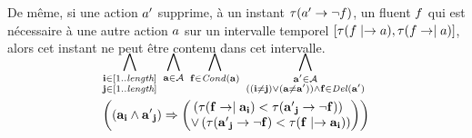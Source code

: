 De même, si une action $a'$ supprime, à un instant $\tau(a'\rightarrow\neg f)$, un fluent $f$ qui est nécessaire à une autre action $a$ sur un intervalle temporel $[\tau(f\mid\rightarrow a), \tau(f\rightarrow\mid a)]$, alors cet instant ne peut être contenu dans cet intervalle.

\begin{small}
\begin{multline*}
~\\[-3em]
\bigwedge\limits_{\substack{\mathbf{i}\in [1..\mathbf{\length}]\\ \mathbf{j}\in [1..\mathbf{\length}]}}%
~\bigwedge\limits_{\substack{\mathbf{\a}\in \mathbf{\A}}}~\bigwedge\limits_{\substack{\mathbf{\f}\in \cond{\mathbf{\a}}}}~\bigwedge\limits_{\substack{\mathbf{\b}\in \mathbf{\A}\\((\mathbf{i} \neq \mathbf{j}) \vee (\mathbf{\a} \neq \mathbf{\b})) \wedge \mathbf{\f} \in \del{\mathbf{\b}}}}\hfill\\
\left(\left(\mathbf{\a}_{\mathbf{i}} \wedge \mathbf{\b}_{\mathbf{j}}\right) \Rightarrow \begin{pmatrix}\left(\tau(\mathbf{f}\rightarrow\mid\mathbf{\a}_\mathbf{i}) < \tau(\mathbf{\b}_\mathbf{j}\rightarrow \neg \mathbf{\f})\right)\hfill\\
 \vee \left(\tau(\mathbf{\b}_\mathbf{j}\rightarrow \neg \mathbf{\f}) < \tau(\mathbf{\f}\mid\rightarrow\mathbf{\a}_\mathbf{i})\right)\end{pmatrix}\right)\hfill\\[-2em]
\end{multline*}
\end{small}


